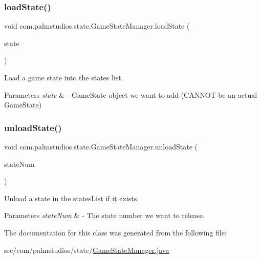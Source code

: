 \subsubsection{\texorpdfstring{load\+State()}{loadState()}}
{\footnotesize\ttfamily void com.\+palmstudios.\+state.\+Game\+State\+Manager.\+load\+State (\begin{DoxyParamCaption}\item[{\hyperlink{classcom_1_1palmstudios_1_1system_1_1_game_state}{Game\+State}}]{state }\end{DoxyParamCaption})}

Load a game state into the states list. 
\begin{DoxyParams}{Parameters}
{\em state} & -\/ Game\+State object we want to add (C\+A\+N\+N\+OT be an actual Game\+State) \\
\hline
\end{DoxyParams}
\mbox{\label{classcom_1_1palmstudios_1_1state_1_1_game_state_manager_adf1d9cba6120bc0867300e032d72cc80}} 
\subsubsection{\texorpdfstring{unload\+State()}{unloadState()}}
{\footnotesize\ttfamily void com.\+palmstudios.\+state.\+Game\+State\+Manager.\+unload\+State (\begin{DoxyParamCaption}\item[{int}]{state\+Num }\end{DoxyParamCaption})}

Unload a state in the states\+List if it exists. 
\begin{DoxyParams}{Parameters}
{\em state\+Num} & -\/ The state number we want to release. \\
\hline
\end{DoxyParams}


The documentation for this class was generated from the following file\+:\begin{DoxyCompactItemize}
\item 
src/com/palmstudios/state/\hyperlink{_game_state_manager_8java}{Game\+State\+Manager.\+java}\end{DoxyCompactItemize}
